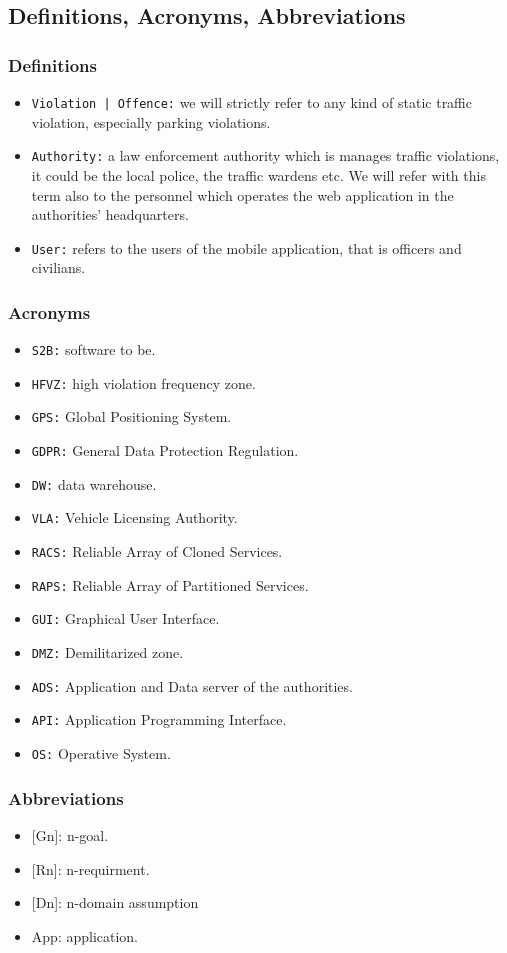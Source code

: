 \documentclass[12pt,a4paper]{article}
\begin{document}
\subsection{Definitions, Acronyms, Abbreviations}
\subsubsection{Definitions}
\begin{itemize}
\item \texttt{Violation | Offence:} we will strictly refer to any kind of static traffic violation, especially parking violations. 
\item \texttt{Authority:} a law enforcement authority which is manages traffic violations, it could be the local police, the traffic wardens etc. We will refer with this term also to the personnel which operates the web application in the authorities' headquarters.
\item \texttt{User:} refers to the users of the mobile application, that is officers and civilians.
\end{itemize}
\subsubsection{Acronyms}
\begin{itemize}
\item \texttt{S2B:} software to be.
\item \texttt{HFVZ:} high violation frequency zone.
\item \texttt{GPS:} Global Positioning System.
\item \texttt{GDPR:} General Data Protection Regulation.
\item \texttt{DW:} data warehouse.
\item \texttt{VLA:} Vehicle Licensing Authority.
\item \texttt{RACS:} Reliable Array of Cloned Services.
\item \texttt{RAPS:} Reliable Array of Partitioned Services.
\item \texttt{GUI:} Graphical User Interface.
\item \texttt{DMZ:} Demilitarized zone.
\item \texttt{ADS:} Application and Data server of the authorities.
\item \texttt{API:} Application Programming Interface.
\item \texttt{OS:} Operative System.
\end{itemize}
\subsubsection{Abbreviations}
\begin{itemize}
	\item {[Gn]}: n-goal.
	\item {[Rn]}: n-requirment.
	\item {[Dn]}: n-domain assumption
	\item {App}: application.
\end{itemize}
\end{document}
